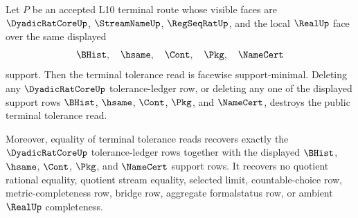 \begin{theorem}
\label{thm:dyadicratcore-terminal-tolerance-facewise-support-minimality}
Let $P$ be an accepted L10 terminal route whose visible faces are $\DyadicRatCoreUp$, $\StreamNameUp$, $\RegSeqRatUp$, and the local $\RealUp$ face over the same displayed
$$
\BHist,\quad \hsame,\quad \Cont,\quad \Pkg,\quad \NameCert
$$
support. Then the terminal tolerance read is facewise support-minimal. Deleting any $\DyadicRatCoreUp$ tolerance-ledger row, or deleting any one of the displayed support rows $\BHist$, $\hsame$, $\Cont$, $\Pkg$, and $\NameCert$, destroys the public terminal tolerance read.

Moreover, equality of terminal tolerance reads recovers exactly the $\DyadicRatCoreUp$ tolerance-ledger rows together with the displayed $\BHist$, $\hsame$, $\Cont$, $\Pkg$, and $\NameCert$ support rows. It recovers no quotient rational equality, quotient stream equality, selected limit, countable-choice row, metric-completeness row, bridge row, aggregate formalstatus row, or ambient $\RealUp$ completeness.
\end{theorem}
